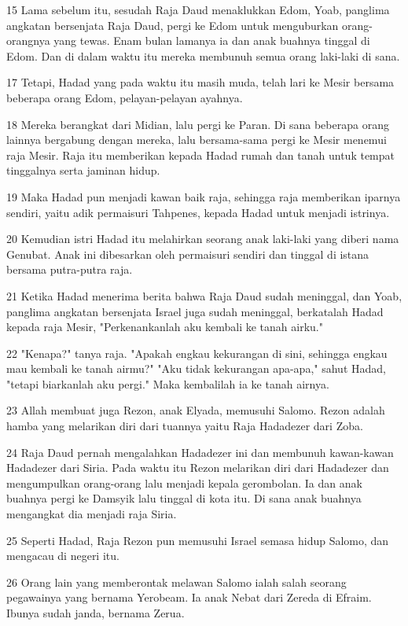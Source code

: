 \par 15 Lama sebelum itu, sesudah Raja Daud menaklukkan Edom, Yoab, panglima angkatan bersenjata Raja Daud, pergi ke Edom untuk menguburkan orang-orangnya yang tewas. Enam bulan lamanya ia dan anak buahnya tinggal di Edom. Dan di dalam waktu itu mereka membunuh semua orang laki-laki di sana.
\par 17 Tetapi, Hadad yang pada waktu itu masih muda, telah lari ke Mesir bersama beberapa orang Edom, pelayan-pelayan ayahnya.
\par 18 Mereka berangkat dari Midian, lalu pergi ke Paran. Di sana beberapa orang lainnya bergabung dengan mereka, lalu bersama-sama pergi ke Mesir menemui raja Mesir. Raja itu memberikan kepada Hadad rumah dan tanah untuk tempat tinggalnya serta jaminan hidup.
\par 19 Maka Hadad pun menjadi kawan baik raja, sehingga raja memberikan iparnya sendiri, yaitu adik permaisuri Tahpenes, kepada Hadad untuk menjadi istrinya.
\par 20 Kemudian istri Hadad itu melahirkan seorang anak laki-laki yang diberi nama Genubat. Anak ini dibesarkan oleh permaisuri sendiri dan tinggal di istana bersama putra-putra raja.
\par 21 Ketika Hadad menerima berita bahwa Raja Daud sudah meninggal, dan Yoab, panglima angkatan bersenjata Israel juga sudah meninggal, berkatalah Hadad kepada raja Mesir, "Perkenankanlah aku kembali ke tanah airku."
\par 22 "Kenapa?" tanya raja. "Apakah engkau kekurangan di sini, sehingga engkau mau kembali ke tanah airmu?" "Aku tidak kekurangan apa-apa," sahut Hadad, "tetapi biarkanlah aku pergi." Maka kembalilah ia ke tanah airnya.
\par 23 Allah membuat juga Rezon, anak Elyada, memusuhi Salomo. Rezon adalah hamba yang melarikan diri dari tuannya yaitu Raja Hadadezer dari Zoba.
\par 24 Raja Daud pernah mengalahkan Hadadezer ini dan membunuh kawan-kawan Hadadezer dari Siria. Pada waktu itu Rezon melarikan diri dari Hadadezer dan mengumpulkan orang-orang lalu menjadi kepala gerombolan. Ia dan anak buahnya pergi ke Damsyik lalu tinggal di kota itu. Di sana anak buahnya mengangkat dia menjadi raja Siria.
\par 25 Seperti Hadad, Raja Rezon pun memusuhi Israel semasa hidup Salomo, dan mengacau di negeri itu.
\par 26 Orang lain yang memberontak melawan Salomo ialah salah seorang pegawainya yang bernama Yerobeam. Ia anak Nebat dari Zereda di Efraim. Ibunya sudah janda, bernama Zerua.
